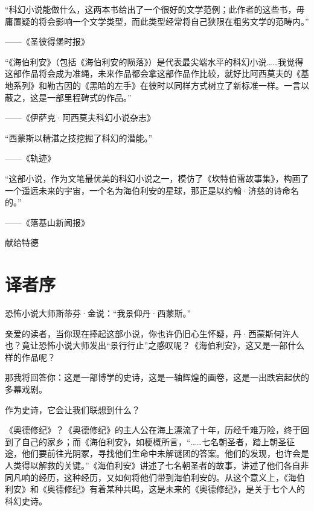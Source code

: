 \documentclass[AutoFakeBold=true]{book}
\begin{document}
``科幻小说能做什么，这两本书给出了一个很好的文学范例；此作者的这些书，毋庸置疑的将会影响一个文学类型，而此类型经常将自己狭限在粗劣文学的范畴内。''\begin{flushright}——《圣彼得堡时报》\end{flushright}

``《海伯利安》（包括《海伯利安的陨落》）是代表最尖端水平的科幻小说……我觉得这部作品将会成为准绳，未来作品都会拿这部作品作比较，就好比阿西莫夫的《基地系列》和勒古因的《黑暗的左手》在彼时以同样方式树立了新标准一样。一言以蔽之，这是一部里程碑式的作品。''\begin{flushright}——《伊萨克·阿西莫夫科幻小说杂志》\end{flushright}

``西蒙斯以精湛之技挖掘了科幻的潜能。''\begin{flushright}——《轨迹》\end{flushright}

``这部小说，作为文笔最优美的科幻小说之一，模仿了《坎特伯雷故事集》，构画了一个遥远未来的宇宙，一个名为海伯利安的星球，那正是以约翰·济慈的诗命名的。''\begin{flushright}——《落基山新闻报》\end{flushright}

\newpage
\vspace*{\fill}
\begin{center}
	献给特德
\end{center}
\vspace*{\fill}

\newpage
\pagestyle{plain}
\tableofcontents

\newpage
\pagestyle{headings}

\chapter{译者序}

恐怖小说大师斯蒂芬·金说：``我景仰丹·西蒙斯。''

亲爱的读者，当你现在捧起这部小说，你也许仍旧心生怀疑，丹·西蒙斯何许人也？竟让恐怖小说大师发出``景行行止''之感叹呢？《海伯利安》，这又是一部什么样的作品呢？

那我将回答你：这是一部博学的史诗，这是一轴辉煌的画卷，这是一出跌宕起伏的多幕戏剧。

作为史诗，它会让我们联想到什么？

《奥德修纪》？《奥德修纪》的主人公在海上漂流了十年，历经千难万险，终于回到了自己的家乡；而《海伯利安》，如梗概所言，``……七名朝圣者，踏上朝圣征途，他们要前往光阴冢，寻找他们生命中未解谜团的答案。他们的发现，也许会是人类得以解救的关键。''《海伯利安》讲述了七名朝圣者的故事，讲述了他们各自非同凡响的经历，这种经历，又如何将他们带到海伯利安的。从这个意义上，《海伯利安》和《奥德修纪》有着某种共鸣，这是未来的《奥德修纪》，是关于七个人的科幻史诗。
\end{document}

